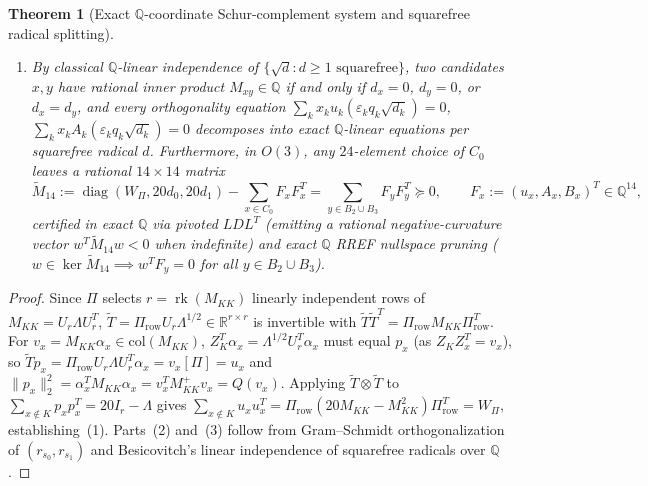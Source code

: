 \documentclass[11pt,reqno]{amsart}
\newtheorem{theorem}{Theorem}[section]
\theoremstyle{definition}
\theoremstyle{remark}
\numberwithin{equation}{section}
\numberwithin{table}{section}
\DeclareMathOperator{\rk}{rk}
\DeclareMathOperator{\diag}{diag}
\begin{document}
\begin{theorem}[Exact $\mathbb{Q}$-coordinate Schur-complement system and squarefree radical splitting]
\begin{enumerate}
\begin{itemize}
    \item If $s_{\mathrm{rem}} = 3$ ($S_1(4,4,4,4)$, $r = 12$) and $\max_{x \in C_0} \mathrm{rem}_1(x) = d_1 > 0$ is attained at $s_1 \in C_0$ (\emph{Subcase~B}), rotating $O(2)$ on the remaining two coordinates so $r_{s_1} = (A_{s_1}/\sqrt{d_0}, \sqrt{d_1}, 0)$ determines $B_x := M_{s_1, x} - g(s_1, x) - \frac{A_{s_1} A_x}{d_0} \in \mathbb{Q}$ and $\mathrm{rem}_2(x) := \mathrm{rem}_1(x) - B_x^2 / d_1 = q_x^2 d_x \ge 0$, leaving one sign $c_x = \varepsilon_x q_x \sqrt{d_x}$.
  \end{itemize}
  \item By classical $\mathbb{Q}$-linear independence of $\{\sqrt{d} : d \ge 1 \text{ squarefree}\}$, two candidates $x, y$ have rational inner product $M_{xy} \in \mathbb{Q}$ if and only if $d_x = 0$, $d_y = 0$, or $d_x = d_y$, and every orthogonality equation $\sum_k x_k u_k (\varepsilon_k q_k \sqrt{d_k}) = 0$, $\sum_k x_k A_k (\varepsilon_k q_k \sqrt{d_k}) = 0$ decomposes into exact $\mathbb{Q}$-linear equations per squarefree radical $d$. Furthermore, in $O(3)$, any $24$-element choice of $C_0$ leaves a rational $14 \times 14$ matrix
  \[
    \tilde{M}_{14} := \diag(W_\Pi, 20 d_0, 20 d_1) - \sum_{x \in C_0} F_x F_x^T = \sum_{y \in B_2 \cup B_3} F_y F_y^T \succeq 0, \qquad F_x := (u_x, A_x, B_x)^T \in \mathbb{Q}^{14},
  \]
  certified in exact $\mathbb{Q}$ via pivoted $LDL^T$ (emitting a rational negative-curvature vector $w^T \tilde{M}_{14} w < 0$ when indefinite) and exact $\mathbb{Q}$ RREF nullspace pruning ($w \in \ker \tilde{M}_{14} \implies w^T F_y = 0$ for all $y \in B_2 \cup B_3$).
\end{enumerate}
\end{theorem}

\begin{proof}
Since $\Pi$ selects $r = \rk(M_{KK})$ linearly independent rows of $M_{KK} = U_r \Lambda U_r^T$, $\tilde{T} = \Pi_{\mathrm{row}} U_r \Lambda^{1/2} \in \mathbb{R}^{r \times r}$ is invertible with $\tilde{T}\tilde{T}^T = \Pi_{\mathrm{row}} M_{KK} \Pi_{\mathrm{row}}^T$. For $v_x = M_{KK}\alpha_x \in \mathrm{col}(M_{KK})$, $Z_K^T \alpha_x = \Lambda^{1/2} U_r^T \alpha_x$ must equal $p_x$ (as $Z_K Z_x^T = v_x$), so $\tilde{T} p_x = \Pi_{\mathrm{row}} U_r \Lambda U_r^T \alpha_x = v_x[\Pi] = u_x$ and $\|p_x\|_2^2 = \alpha_x^T M_{KK} \alpha_x = v_x^T M_{KK}^+ v_x = Q(v_x)$. Applying $\tilde{T} \otimes \tilde{T}$ to $\sum_{x \notin K} p_x p_x^T = 20 I_r - \Lambda$ gives $\sum_{x \notin K} u_x u_x^T = \Pi_{\mathrm{row}}(20 M_{KK} - M_{KK}^2)\Pi_{\mathrm{row}}^T = W_\Pi$, establishing~(1). Parts~(2) and~(3) follow from Gram--Schmidt orthogonalization of $(r_{s_0}, r_{s_1})$ and Besicovitch's linear independence of squarefree radicals over $\mathbb{Q}$.
\end{proof}
\end{document}
